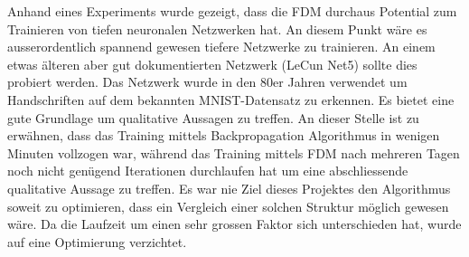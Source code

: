 Anhand eines Experiments wurde gezeigt, dass die FDM durchaus Potential zum Trainieren von tiefen neuronalen Netzwerken hat. An diesem Punkt wäre es ausserordentlich spannend gewesen tiefere Netzwerke zu trainieren. An einem etwas älteren aber gut dokumentierten Netzwerk (LeCun Net5) sollte dies probiert werden. Das Netzwerk wurde in den 80er Jahren verwendet um Handschriften auf dem bekannten MNIST-Datensatz zu erkennen. Es bietet eine gute Grundlage um qualitative Aussagen zu treffen. An dieser Stelle ist zu erwähnen, dass das Training mittels Backpropagation Algorithmus in wenigen Minuten vollzogen war, während das Training mittels FDM nach mehreren Tagen noch nicht genügend Iterationen durchlaufen hat um eine abschliessende qualitative Aussage zu treffen. Es war nie Ziel dieses Projektes den Algorithmus soweit zu optimieren, dass ein Vergleich einer solchen Struktur möglich gewesen wäre. Da die Laufzeit um einen sehr grossen Faktor sich unterschieden hat, wurde auf eine Optimierung verzichtet. 